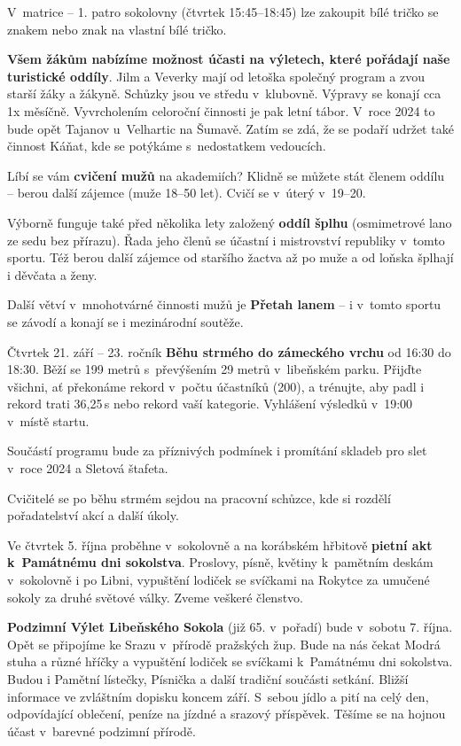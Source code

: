 \documentclass[11pt]{article}
\begin{document}
V~matrice – 1. patro sokolovny (čtvrtek 15:45–18:45) lze zakoupit bílé tričko se znakem nebo znak na vlastní bílé tričko. 

\textbf{Všem žákům nabízíme možnost účasti na výletech, které pořádají naše turistické oddíly}. Jilm a Veverky mají od letoška společný program a zvou starší žáky a žákyně. Schůzky jsou ve středu v~klubovně. Výpravy se konají cca 1x měsíčně. Vyvrcholením celoroční činnosti je pak letní tábor. V~roce 2024 to bude opět Tajanov u~Velhartic na Šumavě. Zatím se zdá, že se podaří udržet také činnost Káňat, kde se potýkáme s~nedostatkem vedoucích.

Líbí se vám \textbf{cvičení mužů} na akademiích? Klidně se můžete stát členem oddílu – berou další zájemce (muže 18–50 let). Cvičí se v~úterý v~19–20.

Výborně funguje také před několika lety založený \textbf{oddíl šplhu} (osmimetrové lano ze sedu bez přírazu). Řada jeho členů se účastní i mistrovství republiky v~tomto sportu. Též berou další zájemce od staršího žactva až po muže a od loňska šplhají i děvčata a ženy. 

Další větví v~mnohotvárné činnosti mužů je \textbf{Přetah lanem} – i v~tomto sportu se závodí a konají se i mezinárodní soutěže. 

Čtvrtek 21. září – 23. ročník \textbf{Běhu strmého do zámeckého vrchu} od 16:30 do 18:30. Běží se 199 metrů s~převýšením 29 metrů v~libeňském parku. Přijďte všichni, ať překonáme rekord v~počtu účastníků (200), a trénujte, aby padl i rekord trati 36,25\,s nebo rekord vaší kategorie. Vyhlášení výsledků v~19:00 v~místě startu. 

Součástí programu bude za příznivých podmínek i promítání skladeb pro slet v~roce 2024 a Sletová štafeta.

Cvičitelé se po běhu strmém sejdou na pracovní schůzce, kde si rozdělí pořadatelství akcí a další úkoly.

Ve čtvrtek 5. října proběhne v~sokolovně a na korábském hřbitově \textbf{pietní akt k~Památnému dni sokolstva}. Proslovy, písně, květiny k~pamětním deskám v~sokolovně i po Libni, vypuštění lodiček se svíčkami na Rokytce za umučené sokoly za druhé světové války. Zveme veškeré členstvo.

\textbf{Podzimní Výlet Libeňského Sokola} (již 65. v~pořadí) bude v~sobotu 7. října. Opět se připojíme ke Srazu v~přírodě pražských žup. Bude na nás čekat Modrá stuha a různé hříčky a vypuštění lodiček se svíčkami k~Památnému dni sokolstva. Budou i Pamětní lístečky, Písnička a další tradiční součásti setkání. Bližší informace ve zvláštním dopisku koncem září. S~sebou jídlo a pití na celý den, odpovídající oblečení, peníze na jízdné a srazový příspěvek. Těšíme se na hojnou účast v~barevné podzimní přírodě.  
\end{document}
